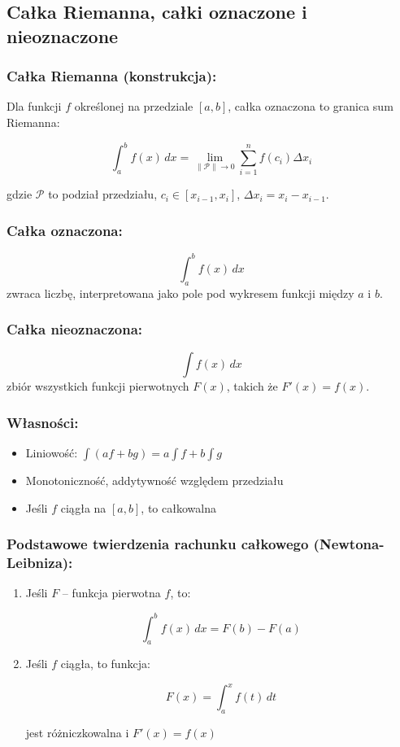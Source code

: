 \subsection{Całka Riemanna, całki oznaczone i nieoznaczone}

\subsubsection*{Całka Riemanna (konstrukcja):}
Dla funkcji $f$ określonej na przedziale $[a, b]$, całka oznaczona to granica sum Riemanna:

$$
\int_a^b f(x)\,dx = \lim_{\|\mathcal{P}\| \to 0} \sum_{i=1}^n f(c_i) \Delta x_i
$$

gdzie $\mathcal{P}$ to podział przedziału, $c_i \in [x_{i-1}, x_i]$, $\Delta x_i = x_i - x_{i-1}$.

\subsubsection*{Całka oznaczona:}

$$
\int_a^b f(x)\,dx
$$
zwraca liczbę, interpretowana jako pole pod wykresem funkcji między $a$ i $b$.

\subsubsection*{Całka nieoznaczona:}

$$
\int f(x)\,dx
$$
zbiór wszystkich funkcji pierwotnych $F(x)$, takich że $F'(x) = f(x)$.

\subsubsection*{Własności:}
\begin{itemize}
    \item Liniowość: $\int (af + bg) = a \int f + b \int g$
    \item Monotoniczność, addytywność względem przedziału
    \item Jeśli $f$ ciągła na $[a, b]$, to całkowalna
\end{itemize}

\subsubsection*{Podstawowe twierdzenia rachunku całkowego (Newtona-Leibniza):}
\begin{enumerate}
    \item Jeśli $F$ -- funkcja pierwotna $f$, to:

    $$
    \int_a^b f(x)\,dx = F(b) - F(a)
    $$
    \item Jeśli $f$ ciągła, to funkcja:

    $$
    F(x) = \int_a^x f(t)\,dt
    $$

    jest różniczkowalna i $F'(x) = f(x)$
\end{enumerate}


